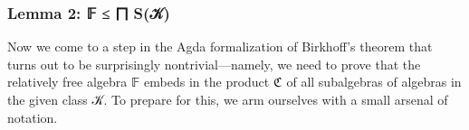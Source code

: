 \begin{code}
%
\>[3]\AgdaSpace{}%
\AgdaSymbol{=}\AgdaSpace{}%
\AgdaSpace{}%
\AgdaSpace{}%
\<%
\\
%
\\[\AgdaEmptyExtraSkip]%
%
\>[3]\AgdaSpace{}%
\AgdaSymbol{:}\AgdaSpace{}%
\AgdaSpace{}%
\AgdaSpace{}%
\AgdaSymbol{\{}\AgdaSymbol{\}\{}\AgdaSymbol{\}(}\AgdaSymbol{\{}\AgdaSymbol{\}\{}\AgdaSymbol{\}}\AgdaSpace{}%
\AgdaSymbol{)}\<%
\\
%
\>[3]\AgdaSpace{}%
\AgdaSymbol{=}\AgdaSpace{}%
\<%
\\
%
\\[\AgdaEmptyExtraSkip]%
%
\>[3]\AgdaSpace{}%
\AgdaSymbol{:}\AgdaSpace{}%
\AgdaSpace{}%
\AgdaSpace{}%
\AgdaSymbol{\{}\AgdaSymbol{\}\{}\AgdaSymbol{\}}\AgdaSpace{}%
\<%
\\
%
\>[3]\AgdaSpace{}%
\AgdaSymbol{=}\AgdaSpace{}%
\AgdaSpace{}%
\<%
\\
%
\\[\AgdaEmptyExtraSkip]%
%
\>[3]\AgdaSpace{}%
\AgdaSymbol{:}\AgdaSpace{}%
\AgdaSpace{}%
\AgdaSpace{}%
\<%
\\
%
\>[3]\AgdaSpace{}%
\AgdaSymbol{=}\AgdaSpace{}%
\AgdaSpace{}%
\AgdaSpace{}%
\AgdaSpace{}%
\AgdaSymbol{(}\AgdaSpace{}%
\AgdaSymbol{)}\AgdaSpace{}%
\<%
\\
\>[0]\<%
\end{code}

\subsubsection{Lemma 2: 𝔽 ≤ ⨅ S(𝒦)}\label{lemma-2-ux1d53d-sux1d4a6}

Now we come to a step in the Agda formalization of Birkhoff's theorem
that turns out to be surprisingly nontrivial---namely, we need to prove
that the relatively free algebra 𝔽 embeds in the product ℭ of all
subalgebras of algebras in the given class 𝒦. To prepare for this, we
arm ourselves with a small arsenal of notation.

